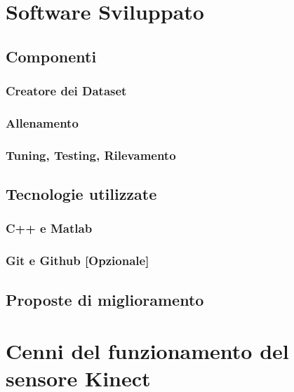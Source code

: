 \begin{appendices}
    \chapter{Software Sviluppato}
    \label{chap:software}
        \section{Componenti}
            \subsection{Creatore dei Dataset}
            \subsection{Allenamento}
            \subsection{Tuning, Testing, Rilevamento}
        \section{Tecnologie utilizzate}
            \subsection{C++ e Matlab}
            \subsection{Git e Github [Opzionale]}
        \section{Proposte di miglioramento}

    \chapter{Cenni del funzionamento del sensore Kinect}
    \label{chap:Cenni del funzionamento del sensore Kinect}
\end{appendices}

